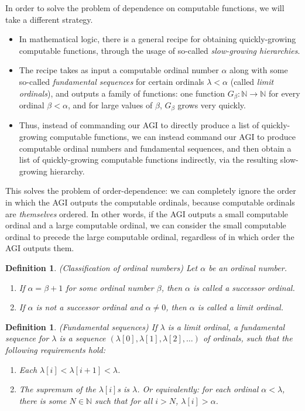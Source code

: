 \documentclass{article}
\newtheorem{definition}[theorem]{Definition}
\begin{document}
In order to solve the problem of dependence on computable functions, we will take
a different strategy.
\begin{itemize}
    \item
    In mathematical logic, there is a general recipe for obtaining
    quickly-growing computable
    functions, through the usage of so-called \emph{slow-growing hierarchies}.
    \item
    The recipe takes as input a computable
    ordinal number $\alpha$ along with some so-called \emph{fundamental
    sequences} for certain ordinals $\lambda<\alpha$ (called \emph{limit ordinals}),
    and outputs a family of functions: one function $G_{\beta}:\mathbb N\to\mathbb N$
    for every ordinal
    $\beta<\alpha$, and for large values of $\beta$, $G_{\beta}$ grows very quickly.
    \item
    Thus, instead of
    commanding our AGI to directly produce a list of quickly-growing computable functions,
    we can instead command our AGI to produce computable ordinal numbers and
    fundamental sequences, and then obtain a list of quickly-growing
    computable functions indirectly, via the resulting slow-growing hierarchy.
\end{itemize}
This solves the problem of order-dependence: we can completely ignore the order
in which the AGI outputs the computable ordinals, because computable ordinals are
\emph{themselves} ordered. In other words, if the AGI outputs a small computable ordinal
and a large computable ordinal, we can consider the small computable ordinal to precede
the large computable ordinal, regardless of in which order the AGI outputs them.

\begin{definition}
    (Classification of ordinal numbers)
    Let $\alpha$ be an ordinal number.
    \begin{enumerate}
        \item
        If $\alpha=\beta+1$ for some ordinal number $\beta$, then $\alpha$ is called
        a \emph{successor ordinal}.
        \item
        If $\alpha$ is not a successor ordinal and $\alpha\neq 0$, then $\alpha$ is
        called a \emph{limit ordinal}.
    \end{enumerate}
\end{definition}

\begin{definition}
\label{fundamentalsequencedefn}
    (Fundamental sequences)
    If $\lambda$ is a limit ordinal, a \emph{fundamental sequence} for $\lambda$
    is a sequence $(\lambda[0],\lambda[1],\lambda[2],\ldots)$
    of ordinals, such that the following requirements hold:
    \begin{enumerate}
        \item
        Each $\lambda[i]<\lambda[i+1]<\lambda$.
        \item
        The supremum of the $\lambda[i]$s is $\lambda$. Or equivalently:
        for each ordinal $\alpha<\lambda$, there is some $N\in\mathbb N$ such that
        for all $i>N$, $\lambda[i]>\alpha$.
    \end{enumerate}
\end{definition}
\end{document}
